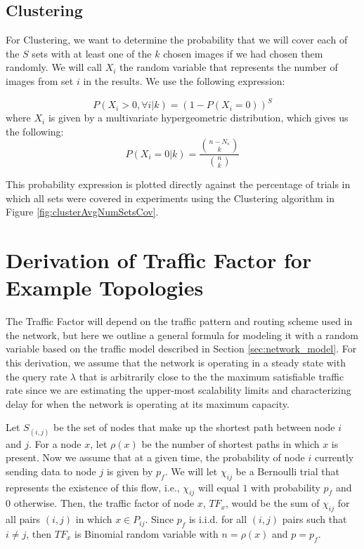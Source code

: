 
\subsection{Clustering}
For Clustering, we want to determine the probability that we will cover each of the $S$ sets with at least one of the $k$ chosen images if we had chosen them randomly.  We will call $X_i$ the random variable that represents the number of images from set $i$ in the results.  We use the following expression:

\begin{equation}
	P( X_i > 0 , \forall i | k) = (1 - P(X_i = 0))^{S}
\end{equation}
where $X_i$ is given by a multivariate hypergeometric distribution, which gives us the following:
\begin{equation}
	P(X_i = 0 | k) = \frac{{n-N_s \choose k}}{{n \choose k}}
\end{equation}

This probability expression is plotted directly against the percentage of trials in which all sets were covered in experiments using the Clustering algorithm in Figure \ref{fig:clusterAvgNumSetsCov}.


\section{Derivation of Traffic Factor for Example Topologies}
\label{sec:derivation_TFs}

The Traffic Factor will depend on the traffic pattern and routing scheme used in the network, but here we outline a general formula for modeling it with a random variable based on the traffic model described in Section \ref{sec:network_model}. For this derivation, we assume that the network is operating in a steady state with the query rate $\lambda$ that is arbitrarily close to the the maximum satisfiable traffic rate since we are estimating the upper-most scalability limits and characterizing delay for when the network is operating at its maximum capacity. 

Let $S_{(i,j)}$ be the set of nodes that make up the shortest path between node $i$ and $j$. For a node $x$, let $\rho(x)$ be the number of shortest paths in which $x$ is present. Now we assume that at a given time, the probability of node $i$ currently sending data to node $j$ is given by $p_f$. 
We will let $\chi_{ij}$ be a Bernoulli trial that represents the existence of this flow, i.e., $\chi_{ij}$ will equal $1$ with probability $p_f$ and $0$ otherwise. Then, the traffic factor of node $x$, $TF_x$, would be the sum of $\chi_{ij}$ for all pairs $(i,j)$ in which $x \in P_{ij}$. Since $p_f$ is i.i.d. for all $(i,j)$ pairs such that $i \neq j$, then $TF_x$ is Binomial random variable with $n=\rho(x)$ and $p=p_{f}$.

